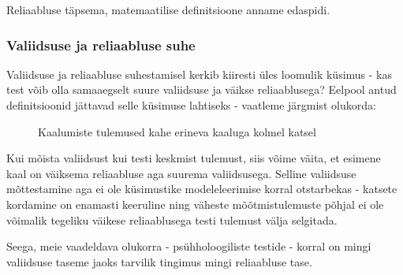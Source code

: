 \documentclass[a4paper,12pt]{article}
\numberwithin{equation}{section}
\theoremstyle{definition}
\begin{document}
Reliaabluse täpsema, matemaatilise definitsioone anname edaspidi. 

\subsubsection{Valiidsuse ja reliaabluse suhe}

Valiidsuse ja reliaabluse suhestamisel kerkib kiiresti üles loomulik küsimus - kas test võib olla samaaegselt suure valiidsuse ja väikse reliaablusega? Eelpool antud definitsioonid jättavad selle küsimuse lahtiseks - vaatleme järgmist olukorda:

\begin{figure}[H]
\colorbox{background_example}{\parbox{\textwidth}{
}}
\caption{Kaalumiste tulemused kahe erineva kaaluga kolmel katsel}
\end{figure}

Kui mõista valiidsust kui testi keskmist tulemust, siis võime väita, et esimene kaal on väiksema reliaabluse aga suurema valiidsusega. Selline valiidsuse mõttestamine aga ei ole küsimustike modeleleerimise korral otstarbekas - katsete kordamine on enamasti keeruline ning väheste mõõtmistulemuste põhjal ei ole võimalik tegeliku väikese reliaablusega testi tulemust välja selgitada. 

Seega, meie vaadeldava olukorra - psühholoogiliste testide - korral on mingi valiidsuse taseme jaoks tarvilik tingimus mingi reliaabluse tase.    
\end{document}
